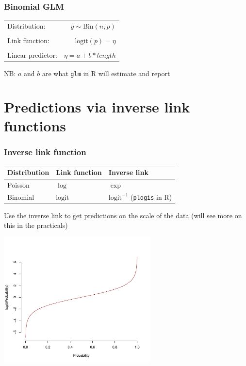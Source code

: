 \documentclass[dvipsnames]{beamer}
\begin{document}
\begin{frame}
\frametitle{Binomial GLM}
\begin{center}
\begin{tabular}{lr}
Distribution: & $y \sim \textrm{Bin}(n,p)$\\
&\\
Link function: & $\textrm{logit}(p) = \eta$ \\
&\\
Linear predictor: & $\eta = a+b*length$
\end{tabular}
\end{center}
NB: $a$ and $b$ are what \texttt{glm} in R will estimate and report 
\end{frame}

\section{Predictions via inverse link functions}

\begin{frame}
 \frametitle{Inverse link function}
 \begin{center}
\begin{tabular}{lll}
Distribution & Link function & Inverse link\\
\hline
Poisson & $\log$ & $\exp$\\
Binomial & $\textrm{logit}$  & $\textrm{logit}^{-1}$ (\texttt{plogis} in R)
 \end{tabular}
 \end{center}
 
 Use the inverse link to get predictions on the scale of the data (will see more on this in the practicals)
\begin{center}
        \includegraphics[width=0.6\textwidth]{figures/logit_link.pdf}
\end{center}
\end{frame}
\end{document}

